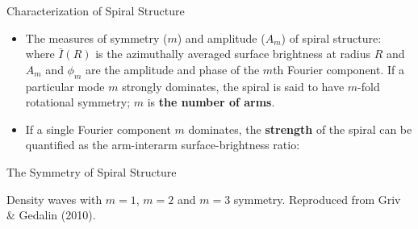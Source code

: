 \documentclass[letterpaper,landscape]{slides}
\begin{document}
\begin{slide}
\begin{center}
{\large \color{red} 
                 Characterization of Spiral Structure  }
\end{center}
\begin{itemize}
\item The measures of symmetry ($m$) and amplitude ($A_m$) of spiral structure:
where $\bar{I}(R)$ is the azimuthally averaged surface brightness at radius $R$ and
$A_m$ and $\phi_m$ are the amplitude and phase of the $m$th Fourier component. If
a particular mode $m$ strongly dominates, the spiral is said to have $m$-fold
rotational symmetry; $m$ is {\bf the number of arms}.

\item If a single Fourier component $m$ dominates, the {\bf strength} of the
spiral can be quantified as the arm-interarm surface-brightness ratio:

\end{itemize}
\vfill
\end{slide}

\begin{slide}
\begin{center}
{\large \color{red} 
                  The Symmetry of Spiral Structure  }
\end{center}

\begin{center}
\vskip -0.0in
\end{center}

Density waves with $m=1$, $m=2$ and $m=3$ symmetry. Reproduced from Griv \& Gedalin
(2010).

\vfill
\end{slide}
\end{document}
